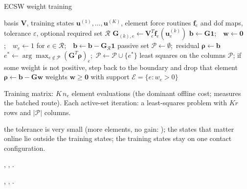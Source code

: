 \begin{algbox}{ECSW weight training}
\begin{pseudo}
\Require basis $\bm V$, training states $\bm u^{(1)},\dots,\bm u^{(K)}$, element force routines $\bm f_e$ and dof maps, tolerance $\varepsilon$, optional required set $\mathcal R$
 
    \State $\bm G_{(k),e}\gets\bm V_e^T\bm f_e(\bm u^{(k)}_e)$
  \EndFor
\EndFor
\State $\bm b\gets\bm G\bm 1$;\ \ $\bm w\gets\bm 0$;\ \ $w_e\gets1$ for $e\in\mathcal R$;\ \ $\bm b\gets\bm b-\bm G_{\mathcal R}\bm 1$
\State passive set $\mathcal P\gets\emptyset$;\ residual $\bm\rho\gets\bm b$
  \State $e^\ast\gets\arg\max_{e\notin\mathcal P}(\bm G^T\bm\rho)_e$;\ $\mathcal P\gets\mathcal P\cup\{e^\ast\}$
  \State least squares on the columns $\mathcal P$; if some weight is not positive, step back to the boundary and drop that element 
  \State $\bm\rho\gets\bm b-\bm G\bm w$
\EndWhile
\Ensure weights $\bm w\ge\bm 0$ with support $\mathcal E=\{e:w_e>0\}$
\end{pseudo}
\begin{algdet}
\item[Cost] Training matrix: $K\,n_e$ element evaluations (the dominant offline cost;  measures the batched route). Each active-set iteration: a least-squares problem with $Kr$ rows and $|\mathcal P|$ columns.
\item[Fails when] the tolerance is very small (more elements, no gain: ); the states that matter online lie outside the training states; the training states stay on one contact configuration.
\item[Code] , , .
\item[Verified in] , , .
\end{algdet}
\end{algbox}


